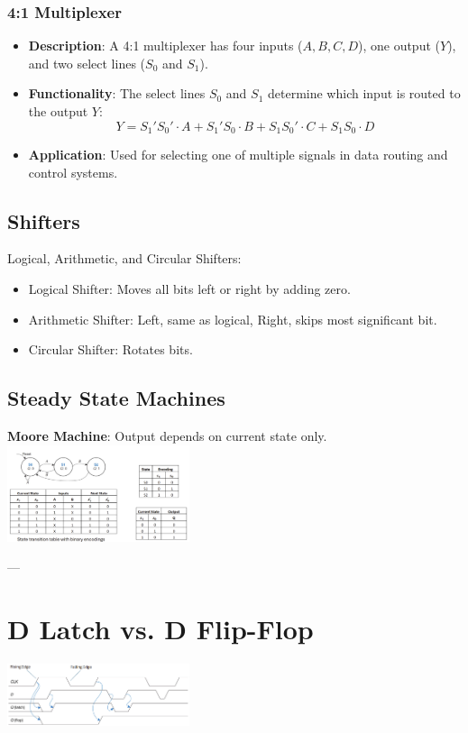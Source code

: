 \documentclass[10pt]{article}
\begin{document}
\begin{multicols}{2}
\subsubsection{4:1 Multiplexer}
\begin{itemize}
    \item \textbf{Description}: A 4:1 multiplexer has four inputs (\( A, B, C, D \)), one output (\( Y \)), and two select lines (\( S_0 \) and \( S_1 \)).
    \item \textbf{Functionality}: The select lines \( S_0 \) and \( S_1 \) determine which input is routed to the output \( Y \):
    \[
    Y = S_1'S_0' \cdot A + S_1'S_0 \cdot B + S_1S_0' \cdot C + S_1S_0 \cdot D
    \]
    
    \item \textbf{Application}: Used for selecting one of multiple signals in data routing and control systems.
\end{itemize}

\subsection{Shifters}
Logical, Arithmetic, and Circular Shifters:
\begin{itemize}\itemsep0pt
    \item Logical Shifter: Moves all bits left or right by adding zero.
    \item Arithmetic Shifter: Left, same as logical, Right, skips most significant bit.
    \item Circular Shifter: Rotates bits.
\end{itemize}

\subsection{Steady State Machines}
\textbf{Moore Machine}: Output depends on current state only. \\
\includegraphics[width=0.4\textwidth]{moore machine example.png}

--- %

\section{D Latch vs. D Flip-Flop}
\includegraphics[width=0.4\textwidth]{D Latch vs Flip Flop.png}

\end{multicols}
\end{document}
